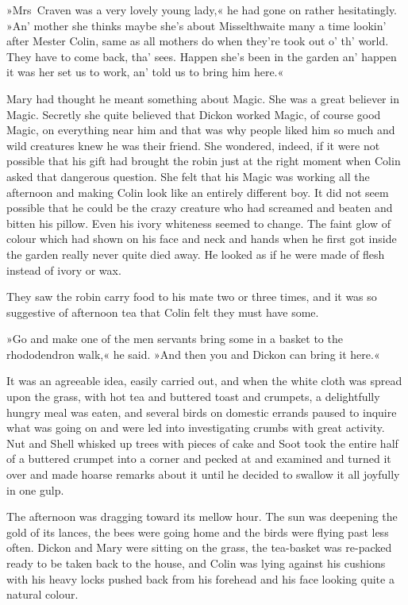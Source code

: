 »Mrs~Craven was a very lovely young lady,« he had gone on rather hesitatingly. »An' mother she thinks maybe she's about Misselthwaite many a time lookin' after Mester Colin, same as all mothers do when they're took out o' th' world. They have to come back, tha' sees. Happen she's been in the garden an' happen it was her set us to work, an' told us to bring him here.«

Mary had thought he meant something about Magic. She was a great believer in Magic. Secretly she quite believed that Dickon worked Magic, of course good Magic, on everything near him and that was why people liked him so much and wild creatures knew he was their friend. She wondered, indeed, if it were not possible that his gift had brought the robin just at the right moment when Colin asked that dangerous question. She felt that his Magic was working all the afternoon and making Colin look like an entirely different boy. It did not seem possible that he could be the crazy creature who had screamed and beaten and bitten his pillow. Even his ivory whiteness seemed to change. The faint glow of colour which had shown on his face and neck and hands when he first got inside the garden really never quite died away. He looked as if he were made of flesh instead of ivory or wax.

They saw the robin carry food to his mate two or three times, and it was so suggestive of afternoon tea that Colin felt they must have some.

»Go and make one of the men servants bring some in a basket to the rhododendron walk,« he said. »And then you and Dickon can bring it here.«

It was an agreeable idea, easily carried out, and when the white cloth was spread upon the grass, with hot tea and buttered toast and crumpets, a delightfully hungry meal was eaten, and several birds on domestic errands paused to inquire what was going on and were led into investigating crumbs with great activity. Nut and Shell whisked up trees with pieces of cake and Soot took the entire half of a buttered crumpet into a corner and pecked at and examined and turned it over and made hoarse remarks about it until he decided to swallow it all joyfully in one gulp.

The afternoon was dragging toward its mellow hour. The sun was deepening the gold of its lances, the bees were going home and the birds were flying past less often. Dickon and Mary were sitting on the grass, the tea-basket was re-packed ready to be taken back to the house, and Colin was lying against his cushions with his heavy locks pushed back from his forehead and his face looking quite a natural colour.

